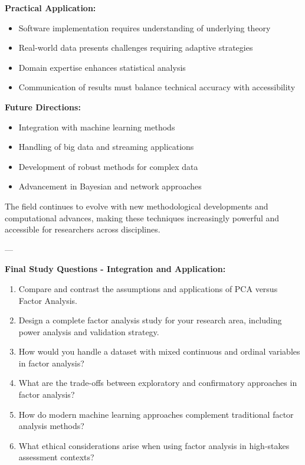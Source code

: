 \documentclass[
]{article}
\begin{document}
\textbf{Practical Application:}

\begin{itemize}
\item
  Software implementation requires understanding of underlying theory
\item
  Real-world data presents challenges requiring adaptive strategies
\item
  Domain expertise enhances statistical analysis
\item
  Communication of results must balance technical accuracy with
  accessibility
\end{itemize}

\textbf{Future Directions:}

\begin{itemize}
\item
  Integration with machine learning methods
\item
  Handling of big data and streaming applications
\item
  Development of robust methods for complex data
\item
  Advancement in Bayesian and network approaches
\end{itemize}

The field continues to evolve with new methodological developments and
computational advances, making these techniques increasingly powerful
and accessible for researchers across disciplines.

---

\textbf{Final Study Questions - Integration and Application:}

\begin{enumerate}
\item
  Compare and contrast the assumptions and applications of PCA versus
  Factor Analysis.
\item
  Design a complete factor analysis study for your research area,
  including power analysis and validation strategy.
\item
  How would you handle a dataset with mixed continuous and ordinal
  variables in factor analysis?
\item
  What are the trade-offs between exploratory and confirmatory
  approaches in factor analysis?
\item
  How do modern machine learning approaches complement traditional
  factor analysis methods?
\item
  What ethical considerations arise when using factor analysis in
  high-stakes assessment contexts?
\end{enumerate}
\end{document}
